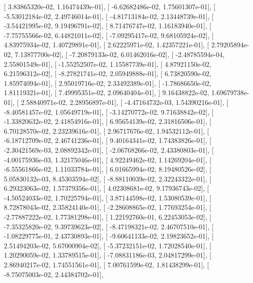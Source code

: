 \documentclass{article}
\begin{document}
       [  3.83865320e-02,   1.16474439e-01],
       [ -6.62682486e-02,   1.75601307e-01],
       [ -5.53012184e-02,   2.49746014e-01],
       [ -4.81713184e-02,   2.13448739e-01],
       [ -3.54421995e-02,   9.19496791e-02],
       [  8.71476747e-02,   1.16183940e-01],
       [ -7.75755566e-02,   6.44821011e-02],
       [ -7.09295417e-02,   9.68105924e-02],
       [  4.83975934e-02,   1.40729891e-01],
       [  2.62225971e-02,   1.42357221e-01],
       [  2.79205894e-02,   7.13877700e-02],
       [ -7.20879133e-02,   6.01462016e-02],
       [ -2.48785594e-04,   2.55801549e-01],
       [ -1.55252507e-02,   1.15587739e-01],
       [  4.87921150e-02,   6.21596312e-02],
       [ -8.27821741e-02,   2.05949888e-01],
       [  6.73820590e-02,   1.85974094e-01],
       [  2.95019716e-02,   2.33492389e-01],
       [ -1.78686650e-02,   1.81119321e-01],
       [  7.49995351e-02,   2.09640404e-01],
       [  9.16438822e-02,   1.69679738e-01],
       [  2.58840971e-02,   2.28956897e-01],
       [ -4.47164732e-03,   1.54390216e-01],
       [ -8.40581457e-02,   1.05649719e-01],
       [ -3.14270772e-02,   9.71638842e-02],
       [ -1.33820632e-02,   2.41854916e-01],
       [  6.95654139e-02,   2.31816506e-01],
       [  6.70128570e-02,   2.23239616e-01],
       [  2.96717676e-02,   1.94532112e-01],
       [ -6.18712709e-02,   2.46741236e-01],
       [  9.40164341e-02,   1.74383826e-01],
       [ -2.30421569e-03,   2.08892342e-01],
       [ -2.06768266e-02,   2.43380803e-01],
       [ -4.00175936e-03,   1.32175046e-01],
       [  4.92249462e-02,   1.14269204e-01],
       [ -6.55561866e-02,   1.11033784e-01],
       [  6.01665994e-02,   8.19480526e-02],
       [  5.05830132e-03,   8.45303594e-02],
       [ -8.88110039e-02,   2.32243322e-01],
       [  6.29323063e-02,   1.57379356e-01],
       [  4.02308681e-02,   9.17936743e-02],
       [ -4.50524033e-02,   1.70225794e-01],
       [  3.87144598e-02,   1.53080539e-01],
       [  8.72878043e-02,   2.35824140e-01],
       [ -2.28608865e-02,   1.77693254e-01],
       [ -2.77887222e-02,   1.77381298e-01],
       [  1.22192760e-01,   6.22453053e-02],
       [ -7.35325820e-02,   9.39739623e-02],
       [ -8.47198321e-02,   2.46707510e-01],
       [ -1.08229775e-01,   2.43730893e-01],
       [ -9.60641133e-02,   2.19823652e-01],
       [  2.51494203e-02,   5.67000904e-02],
       [ -5.37232151e-02,   1.72028540e-01],
       [  1.20290059e-02,   1.33789515e-01],
       [ -7.08831186e-03,   2.04817299e-01],
       [  2.86940217e-02,   1.74551561e-01],
       [  7.00761599e-02,   1.81438299e-01],
       [ -8.75075003e-02,   2.44384702e-01],
\end{document}
